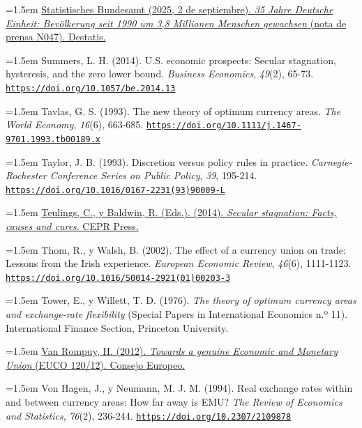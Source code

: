 \documentclass[10pt,a4paper]{article}
\begin{document}
\noindent\hangindent=1.5em \href{https://www.destatis.de/DE/Presse/Pressemitteilungen/2025/08/PD25_N047_12.html}{Statistisches Bundesamt (2025, 2 de septiembre). \textit{35 Jahre Deutsche Einheit: Bevölkerung seit 1990 um 3,8 Millionen Menschen gewachsen} (nota de prensa N047). Destatis.}

\noindent\hangindent=1.5em Summers, L. H. (2014). U.S. economic prospects: Secular stagnation, hysteresis, and the zero lower bound. \textit{Business Economics}, \textit{49}(2), 65-73. \href{https://doi.org/10.1057/be.2014.13}{\nolinkurl{https://doi.org/10.1057/be.2014.13}}

\noindent\hangindent=1.5em Tavlas, G. S. (1993). The new theory of optimum currency areas. \textit{The World Economy}, \textit{16}(6), 663-685. \href{https://doi.org/10.1111/j.1467-9701.1993.tb00189.x}{\nolinkurl{https://doi.org/10.1111/j.1467-9701.1993.tb00189.x}}

\noindent\hangindent=1.5em Taylor, J. B. (1993). Discretion versus policy rules in practice. \textit{Carnegie-Rochester Conference Series on Public Policy}, \textit{39}, 195-214. \href{https://doi.org/10.1016/0167-2231(93)90009-L}{\nolinkurl{https://doi.org/10.1016/0167-2231(93)90009-L}}

\noindent\hangindent=1.5em \href{https://cepr.org/publications/books-and-reports/secular-stagnation-facts-causes-and-cures}{Teulings, C., y Baldwin, R. (Eds.). (2014). \textit{Secular stagnation: Facts, causes and cures}. CEPR Press.}

\noindent\hangindent=1.5em Thom, R., y Walsh, B. (2002). The effect of a currency union on trade: Lessons from the Irish experience. \textit{European Economic Review}, \textit{46}(6), 1111-1123. \href{https://doi.org/10.1016/S0014-2921(01)00203-3}{\nolinkurl{https://doi.org/10.1016/S0014-2921(01)00203-3}}

\noindent\hangindent=1.5em Tower, E., y Willett, T. D. (1976). \textit{The theory of optimum currency areas and exchange-rate flexibility} (Special Papers in International Economics n.º 11). International Finance Section, Princeton University.

\noindent\hangindent=1.5em \href{https://data.consilium.europa.eu/doc/document/ST-120-2012-INIT/en/pdf}{Van Rompuy, H. (2012). \textit{Towards a genuine Economic and Monetary Union} (EUCO 120/12). Consejo Europeo.}

\noindent\hangindent=1.5em Von Hagen, J., y Neumann, M. J. M. (1994). Real exchange rates within and between currency areas: How far away is EMU? \textit{The Review of Economics and Statistics}, \textit{76}(2), 236-244. \href{https://doi.org/10.2307/2109878}{\nolinkurl{https://doi.org/10.2307/2109878}}
\end{document}
